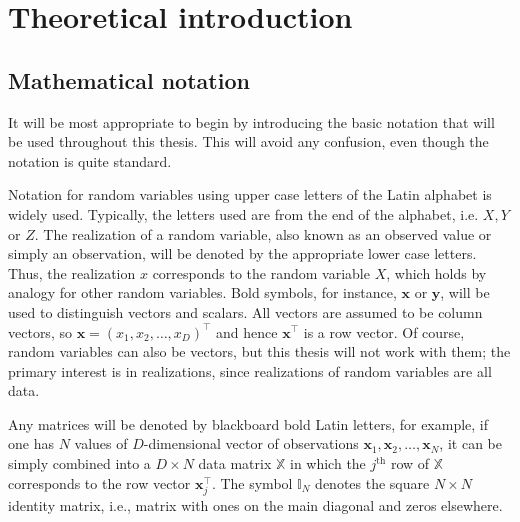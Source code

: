 \chapter{Theoretical introduction}

\section{Mathematical notation}\label{sec:terminology}
It will be most appropriate to begin by introducing the basic notation that will be used throughout this thesis. This will avoid any confusion, even though the notation is quite standard. 

Notation for random variables using upper case letters of the Latin alphabet is widely used. Typically, the letters used are from the end of the alphabet, i.e. $X,Y$ or $Z$. The realization of a random variable, also known as an observed value or simply an observation, will be denoted by the appropriate lower case letters. Thus, the realization  $x$ corresponds to the random variable $X$, which holds by analogy for other random variables. Bold symbols, for instance, $\boldsymbol{x}$ or $\boldsymbol{y}$, will be used to distinguish vectors and scalars. All vectors are assumed to be column vectors, so $\boldsymbol{x} = \left(x_1,x_2,\dots,x_D\right)^\top$ and hence $\boldsymbol{x}^\top$ is a row vector. Of course, random variables can also be vectors, but this thesis will not work with them; the primary interest is in realizations, since realizations of random variables are all data. 

Any matrices will be denoted by blackboard bold Latin letters, for example, if one has $N$ values of $D$-dimensional vector of observations $\boldsymbol{x}_1,\boldsymbol{x}_2,\dots,\boldsymbol{x}_N$, it can be simply combined into a $D \times N$ data matrix $\mathbb{X}$ in which the $j^{\mathrm{th}}$ row of $\mathbb{X}$ corresponds to the row vector $\boldsymbol{x}_j^\top$. The symbol $\mathbb{I}_N$ denotes the square $N \times N$ identity matrix, i.e., matrix with ones on the main diagonal and zeros elsewhere.



